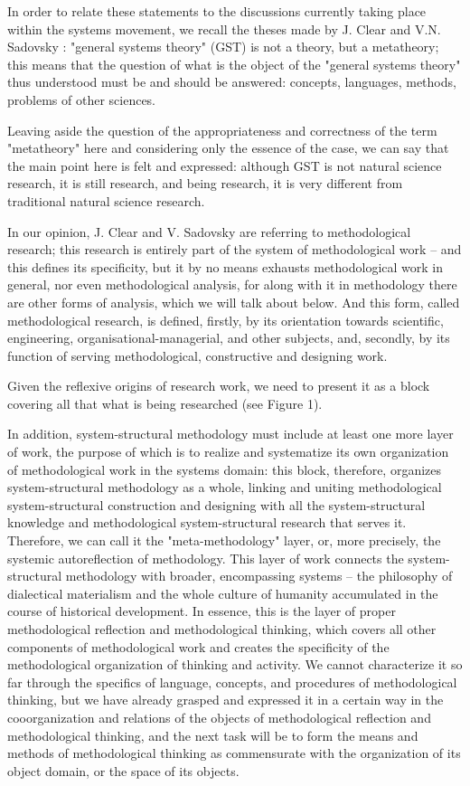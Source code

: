 \documentclass[11pt,a4paper]{article}
\begin{document}
In order to relate these statements to the discussions currently taking place
within the systems movement, we recall the theses made by J. Clear and
V.N. Sadovsky \cite{Trends1972, Sadovsky1974}: "general systems theory" (GST)
is not a theory, but a metatheory; this means that the question of what is the
object of the "general systems theory" thus understood must be and should be
answered: concepts, languages, methods, problems of other sciences.

Leaving aside the question of the appropriateness and correctness of the term
"metatheory" here and considering only the essence of the case, we can say
that the main point here is felt and expressed: although GST is not natural
science research, it is still research, and being research, it is very
different from traditional natural science research.

In our opinion, J. Clear and V. Sadovsky are referring to methodological
research; this research is entirely part of the system of methodological work
– and this defines its specificity, but it by no means exhausts methodological
work in general, nor even methodological analysis, for along with it in
methodology there are other forms of analysis, which we will talk about below.
And this form, called methodological research, is defined, firstly, by its
orientation towards scientific, engineering, organisational-managerial, and
other subjects, and, secondly, by its function of serving methodological,
constructive and designing work.

Given the reflexive origins of research work, we need to present it as a block
covering all that what is being researched (see Figure 1).

In addition, system-structural methodology must include at least one more
layer of work, the purpose of which is to realize and systematize its own
organization of methodological work in the systems domain: this block,
therefore, organizes system-structural methodology as a whole, linking and
uniting methodological system-structural construction and designing with all
the system-structural knowledge and methodological system-structural research
that serves it. Therefore, we can call it the "meta-methodology" layer, or,
more precisely, the systemic autoreflection of methodology. This layer of
work connects the system-structural methodology with broader, encompassing
systems – the philosophy of dialectical materialism and the whole culture of
humanity accumulated in the course of historical development. In essence, this
is the layer of proper methodological reflection and methodological thinking,
which covers all other components of methodological work and creates the
specificity of the methodological organization of thinking and activity. We
cannot characterize it so far through the specifics of language, concepts, and
procedures of methodological thinking, but we have already grasped and
expressed it in a certain way in the cooorganization and relations of the
objects of methodological reflection and methodological thinking, and the next
task will be to form the means and methods of methodological thinking as
commensurate with the organization of its object domain, or the space of its
objects.
\end{document}
